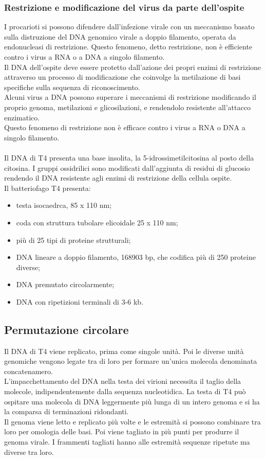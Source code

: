 \subsubsection{Restrizione e modificazione del virus da parte dell'ospite}
I procarioti si possono difendere dall'infezione virale con un meccanismo basato sulla distruzione del DNA genomico virale a doppio filamento, operata da endonucleasi di restrizione. Questo fenomeno, detto restrizione, non è efficiente contro i virus a RNA o a DNA a singolo filamento. 
\\Il DNA dell'ospite deve essere protetto dall'azione dei propri enzimi di restrizione attraverso un processo di modificazione che coinvolge la metilazione di basi specifiche sulla sequenza di riconoscimento. 
\\Alcuni virus a DNA possono superare i meccanismi di restrizione modificando il proprio genoma, metilazioni e glicosilazioni, e rendendolo resistente all'attacco enzimatico.
\\Questo fenomeno di restrizione non è efficace contro i virus a RNA o DNA a singolo filamento. 
\\\\Il DNA di T4 presenta una base insolita, la 5-idrossimetilcitosina al posto della citosina. I gruppi ossidrilici sono modificati dall'aggiunta di residui di glucosio rendendo il DNA resistente agli enzimi di restrizione della cellula ospite. 
\\Il batteriofago T4 presenta:
\begin{itemize}
    \item testa isocaedrca, 85 x 110 nm; 
    \item coda con struttura tubolare elicoidale 25 x 110 nm; 
    \item più di 25 tipi di proteine strutturali; 
    \item DNA lineare a doppio filamento, 168903 bp, che codifica più di 250 proteine diverse; 
    \item DNA premutato circolarmente; 
    \item DNA con ripetizioni terminali di 3-6 kb.
\end{itemize}
\subsection{Permutazione circolare}
Il DNA di T4 viene replicato, prima come singole unità. Poi le diverse unità genomiche vengono legate tra di loro per formare un'unica molecola denominata concatenamero. 
\\L'impacchettamento del DNA nella testa dei virioni necessita il taglio della molecole, indipendentemente dalla sequenza nucleotidica. La testa di T4 può ospitare una molecola di DNA leggermente più lunga di un intero genoma e si ha la comparsa di terminazioni ridondanti. 
\\Il genoma viene letto e replicato più volte e le estremità si possono combinare tra loro per omologia delle basi. Poi viene tagliato in più punti per produrre il genoma virale. I frammenti tagliati hanno alle estremità sequenze ripetute ma diverse tra loro.
